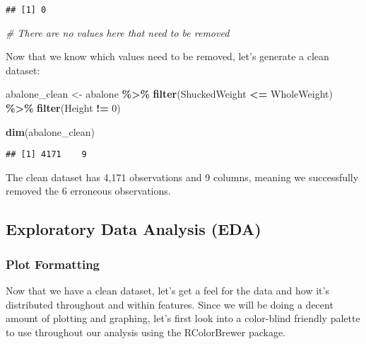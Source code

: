 \documentclass[
]{article}
\newenvironment{Shaded}{\begin{snugshade}}{\end{snugshade}}
\newcommand{\CommentTok}[1]{\textcolor[rgb]{0.56,0.35,0.01}{\textit{#1}}}
\newcommand{\DecValTok}[1]{\textcolor[rgb]{0.00,0.00,0.81}{#1}}
\newcommand{\FunctionTok}[1]{\textcolor[rgb]{0.13,0.29,0.53}{\textbf{#1}}}
\newcommand{\NormalTok}[1]{#1}
\newcommand{\OtherTok}[1]{\textcolor[rgb]{0.56,0.35,0.01}{#1}}
\newcommand{\SpecialCharTok}[1]{\textcolor[rgb]{0.81,0.36,0.00}{\textbf{#1}}}
\begin{document}
\begin{verbatim}
## [1] 0
\end{verbatim}

\begin{Shaded}
\begin{Highlighting}[]
\CommentTok{\# There are no values here that need to be removed}
\end{Highlighting}
\end{Shaded}

Now that we know which values need to be removed, let's generate a clean
dataset:

\begin{Shaded}
\begin{Highlighting}[]
\NormalTok{abalone\_clean }\OtherTok{\textless{}{-}}\NormalTok{ abalone }\SpecialCharTok{\%\textgreater{}\%} \FunctionTok{filter}\NormalTok{(ShuckedWeight }\SpecialCharTok{\textless{}=}\NormalTok{ WholeWeight) }\SpecialCharTok{\%\textgreater{}\%} \FunctionTok{filter}\NormalTok{(Height }\SpecialCharTok{!=} \DecValTok{0}\NormalTok{)}

\FunctionTok{dim}\NormalTok{(abalone\_clean)}
\end{Highlighting}
\end{Shaded}

\begin{verbatim}
## [1] 4171    9
\end{verbatim}

The clean dataset has 4,171 observations and 9 columns, meaning we
successfully removed the 6 erroneous observations.

\hypertarget{exploratory-data-analysis-eda}{%
\subsection{Exploratory Data Analysis
(EDA)}\label{exploratory-data-analysis-eda}}

\hypertarget{plot-formatting}{%
\subsubsection{Plot Formatting}\label{plot-formatting}}

Now that we have a clean dataset, let's get a feel for the data and how
it's distributed throughout and within features. Since we will be doing
a decent amount of plotting and graphing, let's first look into a
color-blind friendly palette to use throughout our analysis using the
RColorBrewer package.
\end{document}
